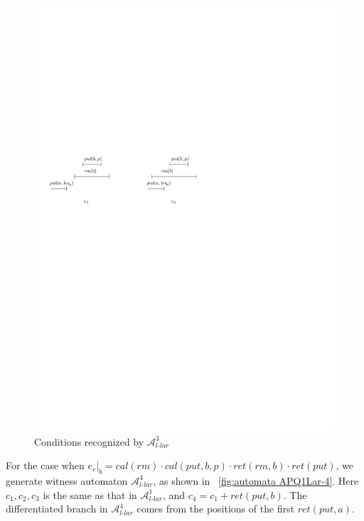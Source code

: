 \begin{figure}[htbp]
  \centering
  \includegraphics[width=0.7 \textwidth]{figures/PIC_HIS_PQ1Lar-rppr.pdf}
  \caption{Conditions recognized by $\mathcal{A}_{\textit{l-lar}}^3$}
  \label{fig:his for APQ1Lar-3}
\end{figure}


For the case when $e_r \vert_{b} = \textit{cal}(\textit{rm}) \cdot \textit{cal}(\textit{put},b,p) \cdot \textit{ret}(\textit{rm},b) \cdot \textit{ret}(\textit{put})$, we generate witness automaton $\mathcal{A}_{\textit{l-lar}}^4$, as shown in \figurename~\ref{fig:automata APQ1Lar-4}. Here $c_1,c_2,c_3$ is the same as that in $\mathcal{A}_{\textit{l-lar}}^1$, and $c_4 = c_1 + \textit{ret}(\textit{put},b)$. The differentiated branch in $\mathcal{A}_{\textit{l-lar}}^4$ comes from the positions of the first $\textit{ret}(\textit{put},a)$.

